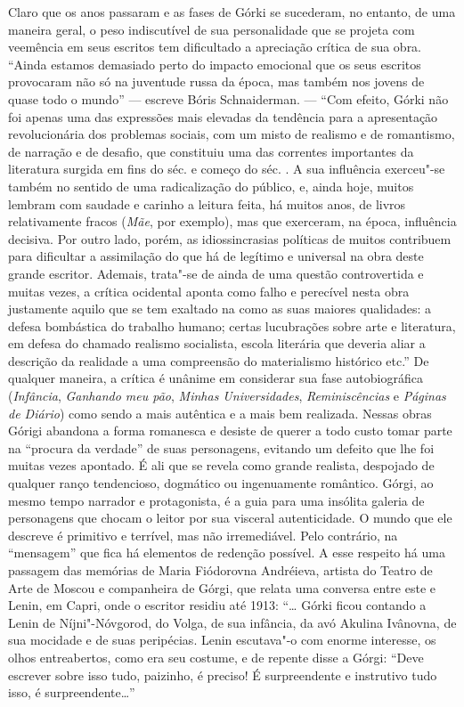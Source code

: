 Claro que os anos passaram e as fases de Górki se sucederam, no entanto,
de uma maneira geral, o peso indiscutível de sua personalidade que se
projeta com veemência em seus escritos tem dificultado a apreciação
crítica de sua obra. ``Ainda estamos demasiado perto do impacto
emocional que os seus escritos provocaram não só na juventude russa da
época, mas também nos jovens de quase todo o mundo'' --- escreve Bóris
Schnaiderman. --- ``Com efeito, Górki não foi apenas uma das expressões
mais elevadas da tendência para a apresentação revolucionária dos
problemas sociais, com um misto de realismo e de romantismo, de narração
e de desafio, que constituiu uma das correntes importantes da literatura
surgida em fins do séc.  e começo do séc. . A sua influência
exerceu"-se também no sentido de uma radicalização do público, e, ainda
hoje, muitos lembram com saudade e carinho a leitura feita, há muitos
anos, de livros relativamente fracos (\emph{Mãe}, por exemplo), mas que
exerceram, na época, influência decisiva. Por outro lado, porém, as
idiossincrasias políticas de muitos contribuem para dificultar a
assimilação do que há de legítimo e universal na obra deste grande
escritor. Ademais, trata"-se de ainda de uma questão controvertida e
muitas vezes, a crítica ocidental aponta como falho e perecível nesta
obra justamente aquilo que se tem exaltado na  como as suas maiores
qualidades: a defesa bombástica do trabalho humano; certas lucubrações
sobre arte e literatura, em defesa do chamado realismo socialista,
escola literária que deveria aliar a descrição da realidade a uma
compreensão do materialismo histórico etc.'' De qualquer maneira, a
crítica é unânime em considerar sua fase autobiográfica
(\emph{Infância}, \emph{Ganhando meu pão}, \emph{Minhas Universidades},
\emph{Reminiscências} e \emph{Páginas de Diário}) como sendo a mais
autêntica e a mais bem realizada. Nessas obras Górigi abandona a forma
romanesca e desiste de querer a todo custo tomar parte na ``procura da
verdade'' de suas personagens, evitando um defeito que lhe foi muitas
vezes apontado. É ali que se revela como grande realista, despojado de
qualquer ranço tendencioso, dogmático ou ingenuamente romântico. Górgi,
ao mesmo tempo narrador e protagonista, é a guia para uma insólita
galeria de personagens que chocam o leitor por sua visceral
autenticidade. O mundo que ele descreve é primitivo e terrível, mas não
irremediável. Pelo contrário, na ``mensagem'' que fica há elementos de
redenção possível. A esse respeito há uma passagem das memórias de Maria
Fiódorovna Andréieva, artista do Teatro de Arte de Moscou e companheira
de Górgi, que relata uma conversa entre este e Lenin, em Capri, onde o
escritor residiu até 1913: ``\ldots{} Górki ficou contando a Lenin de
Níjni"-Nóvgorod, do Volga, de sua infância, da avó Akulina Ivânovna, de
sua mocidade e de suas peripécias. Lenin escutava"-o com enorme
interesse, os olhos entreabertos, como era seu costume, e de repente
disse a Górgi: ``Deve escrever sobre isso tudo, paizinho, é preciso! É
surpreendente e instrutivo tudo isso, é surpreendente\ldots{}''

